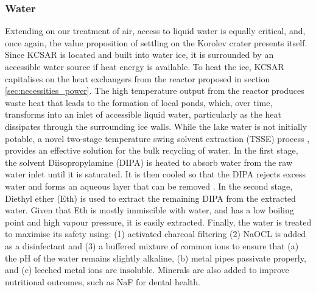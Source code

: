 \documentclass[fleqn,10pt]{Stylesheet} %
\begin{document}
\subsubsection{Water}
\label{sec:necessities_water}

Extending on our treatment of air, access to liquid water is equally critical, and, once again, the value proposition of settling on the Korolev crater presents itself. Since KCSAR is located and built into water ice, it is surrounded by an accessible water source if heat energy is available. To heat the ice, KCSAR capitalises on the heat exchangers from the reactor proposed in section \ref{sec:necessities_power}. The high temperature output from the reactor produces waste heat that leads to the formation of local ponds, which, over time, transforms into an inlet of accessible liquid water, particularly as the heat dissipates through the surrounding ice walls. While the lake water is not initially potable, a novel two-stage temperature swing solvent extraction (TSSE) process \cite{ChanheeBoo2019}, provides an effective solution for the bulk recycling of water. In the first stage, the solvent Diisopropylamine (DIPA) is heated to absorb water from the raw water inlet until it is saturated. It is then cooled so that the DIPA rejects excess water and forms an aqueous layer that can be removed \cite{CRC_84Ed}. In the second stage, Diethyl ether (Eth) is used to extract the remaining DIPA from the extracted water. Given that Eth is mostly immiscible with water, and has a low boiling point and high vapour pressure, it is easily extracted. Finally, the water is treated to maximise its safety using: (1) activated charcoal filtering (2) NaOCL is added as a disinfectant and (3) a buffered mixture of common ions to ensure that (a) the pH of the water remains slightly alkaline, (b) metal pipes passivate properly, and (c) leeched metal ions are insoluble. Minerals are also added to improve nutritional outcomes, such as NaF for dental health.
\end{document}
